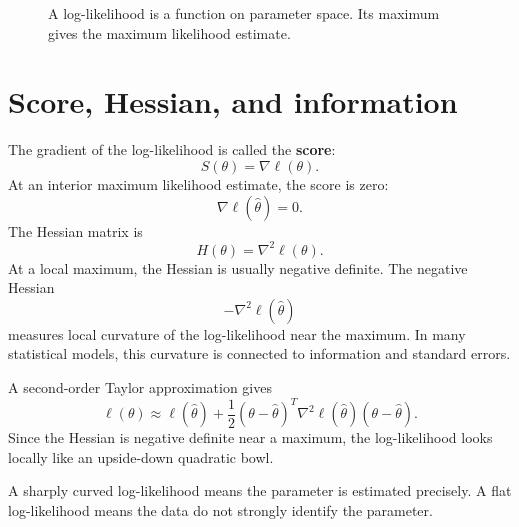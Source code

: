 \documentclass[11pt,oneside]{book}
\newcommand{\grad}{\nabla}
\begin{document}
\begin{figure}[H]
\centering
{}
\caption{A log-likelihood is a function on parameter space. Its maximum gives the maximum likelihood estimate.}
\end{figure}

\section{Score, Hessian, and information}

The gradient of the log-likelihood is called the \textbf{score}:
\[
S(\theta)=\grad\ell(\theta).
\]
At an interior maximum likelihood estimate, the score is zero:
\[
\grad\ell(\hat\theta)=0.
\]
The Hessian matrix is
\[
H(\theta)=\grad^2\ell(\theta).
\]
At a local maximum, the Hessian is usually negative definite. The negative Hessian
\[
-\grad^2\ell(\hat\theta)
\]
measures local curvature of the log-likelihood near the maximum. In many statistical models, this curvature is connected to information and standard errors.

A second-order Taylor approximation gives
\[
\ell(\theta)\approx \ell(\hat\theta)+\frac12(\theta-\hat\theta)^T\grad^2\ell(\hat\theta)(\theta-\hat\theta).
\]
Since the Hessian is negative definite near a maximum, the log-likelihood looks locally like an upside-down quadratic bowl.

\begin{warningbox}
A sharply curved log-likelihood means the parameter is estimated precisely. A flat log-likelihood means the data do not strongly identify the parameter.
\end{warningbox}
\end{document}
